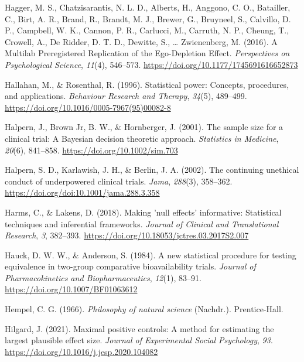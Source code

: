 \documentclass[
  letterpaper,
  DIV=11,
  numbers=noendperiod]{scrreprt}
\newlength{\cslhangindent}
\newlength{\cslentryspacingunit} %
\newenvironment{CSLReferences}[2] %
 {%
  \setlength{\parindent}{0pt}
  \ifodd #1
  \let\oldpar\par
  \def\par{\hangindent=\cslhangindent\oldpar}
  \fi
  \setlength{\parskip}{#2\cslentryspacingunit}
 }%
 {}
\begin{document}
\begin{CSLReferences}{1}{0}
\leavevmode{}%
Hagger, M. S., Chatzisarantis, N. L. D., Alberts, H., Anggono, C. O.,
Batailler, C., Birt, A. R., Brand, R., Brandt, M. J., Brewer, G.,
Bruyneel, S., Calvillo, D. P., Campbell, W. K., Cannon, P. R., Carlucci,
M., Carruth, N. P., Cheung, T., Crowell, A., De Ridder, D. T. D.,
Dewitte, S., \ldots{} Zwienenberg, M. (2016). A {Multilab Preregistered
Replication} of the {Ego-Depletion Effect}. \emph{Perspectives on
Psychological Science}, \emph{11}(4), 546--573.
\url{https://doi.org/10.1177/1745691616652873}

\leavevmode{}%
Hallahan, M., \& Rosenthal, R. (1996). Statistical power: {Concepts},
procedures, and applications. \emph{Behaviour Research and Therapy},
\emph{34}(5), 489--499.
\url{https://doi.org/10.1016/0005-7967(95)00082-8}

\leavevmode{}%
Halpern, J., Brown Jr, B. W., \& Hornberger, J. (2001). The sample size
for a clinical trial: {A Bayesian} decision theoretic approach.
\emph{Statistics in Medicine}, \emph{20}(6), 841--858.
\url{https://doi.org/10.1002/sim.703}

\leavevmode{}%
Halpern, S. D., Karlawish, J. H., \& Berlin, J. A. (2002). The
continuing unethical conduct of underpowered clinical trials.
\emph{Jama}, \emph{288}(3), 358--362.
\url{https://doi.org/doi:10.1001/jama.288.3.358}

\leavevmode{}%
Harms, C., \& Lakens, D. (2018). Making 'null effects' informative:
Statistical techniques and inferential frameworks. \emph{Journal of
Clinical and Translational Research}, \emph{3}, 382--393.
\url{https://doi.org/10.18053/jctres.03.2017S2.007}

\leavevmode{}%
Hauck, D. W. W., \& Anderson, S. (1984). A new statistical procedure for
testing equivalence in two-group comparative bioavailability trials.
\emph{Journal of Pharmacokinetics and Biopharmaceutics}, \emph{12}(1),
83--91. \url{https://doi.org/10.1007/BF01063612}

\leavevmode{}%
Hempel, C. G. (1966). \emph{Philosophy of natural science} (Nachdr.).
{Prentice-Hall}.

\leavevmode{}%
Hilgard, J. (2021). Maximal positive controls: {A} method for estimating
the largest plausible effect size. \emph{Journal of Experimental Social
Psychology}, \emph{93}. \url{https://doi.org/10.1016/j.jesp.2020.104082}


\end{CSLReferences}
\end{document}
